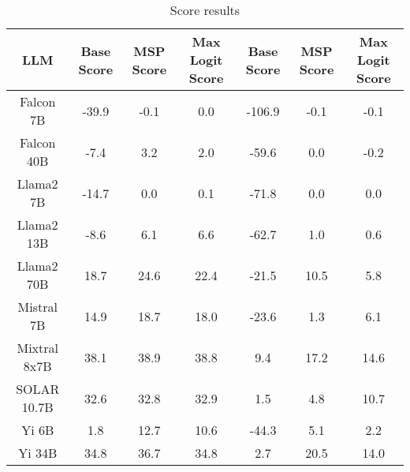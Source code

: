 \renewcommand\arraystretch{1.2}
\begin{table*}
\centering
\begin{tabular}{c|c|c|c|c|c|c}
LLM & Base Score & MSP Score & Max Logit Score & Base Score & MSP Score & Max Logit Score\\ \hline
Falcon 7B & -39.9 & -0.1 & 0.0 & -106.9 & -0.1 & -0.1\\
Falcon 40B & -7.4 & 3.2 & 2.0 & -59.6 & 0.0 & -0.2\\
Llama2 7B & -14.7 & 0.0 & 0.1 & -71.8 & 0.0 & 0.0\\
Llama2 13B & -8.6 & 6.1 & 6.6 & -62.7 & 1.0 & 0.6\\
Llama2 70B & 18.7 & 24.6 & 22.4 & -21.5 & 10.5 & 5.8\\
Mistral 7B & 14.9 & 18.7 & 18.0 & -23.6 & 1.3 & 6.1\\
Mixtral 8x7B & 38.1 & 38.9 & 38.8 & 9.4 & 17.2 & 14.6\\
SOLAR 10.7B & 32.6 & 32.8 & 32.9 & 1.5 & 4.8 & 10.7\\
Yi 6B & 1.8 & 12.7 & 10.6 & -44.3 & 5.1 & 2.2\\
Yi 34B & 34.8 & 36.7 & 34.8 & 2.7 & 20.5 & 14.0\\
\hline
\end{tabular}
\caption{Score results}
\end{table*}
\label{tab:score}
